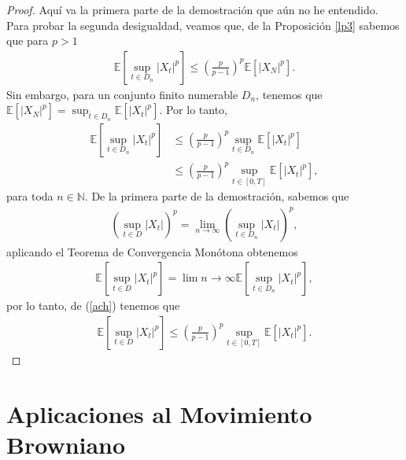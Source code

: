 \begin{proof}
	Aquí va la primera parte de la demostración que aún no he entendido. \\
    
    Para probar la segunda desigualdad, veamos que, de la Proposición \ref{lp3} sabemos que para $p > 1$
    \begin{align*}
		\mathbb{E} \left[ \sup_{t \in D_n} |X_t|^p \right] \leq \left( \frac{p}{p-1} \right)^p \mathbb{E} [|X_N|^p].
	\end{align*}
Sin embargo, para un conjunto finito numerable $D_n$, tenemos que $\mathbb{E} [|X_N|^p] = \sup_{t \in D_n} \mathbb{E}[|X_t|^p]$. Por lo tanto,
	\begin{align}
	\mathbb{E} \left[ \sup_{t \in D_n} |X_t|^p \right] & \leq \left( \frac{p}{p-1} \right)^p \sup_{t \in D_n} \mathbb{E}[|X_t|^p] \nonumber \\
    & \leq \left( \frac{p}{p-1} \right)^p \sup_{t \in [0, T]} \mathbb{E}[|X_t|^p], \label{ach}
	\end{align}
para toda $n \in \mathbb{N}$. De la primera parte de la demostración, sabemos que
	\begin{align*}
		\left( \sup_{t \in D} |X_t| \right)^p = \lim_{n \rightarrow \infty} \left( \sup_{t \in D_n} |X_t| \right)^p,
	\end{align*}
aplicando el Teorema de Convergencia Monótona obtenemos
	\begin{align*}
		\mathbb{E} \left[ \sup_{t \in D} |X_t|^p \right] = \lim{n \rightarrow \infty} \mathbb{E} \left[ \sup_{t \in D_n} |X_t|^p \right],
	\end{align*}
por lo tanto, de (\ref{ach}) tenemos que
	\begin{align*}
		\mathbb{E} \left[ \sup_{t \in D} |X_t|^p \right] \leq \left( \frac{p}{p-1} \right)^p \sup_{t \in [0, T]} \mathbb{E}[|X_t|^p].
	\end{align*}
\end{proof}


\section{Aplicaciones al Movimiento Browniano}




